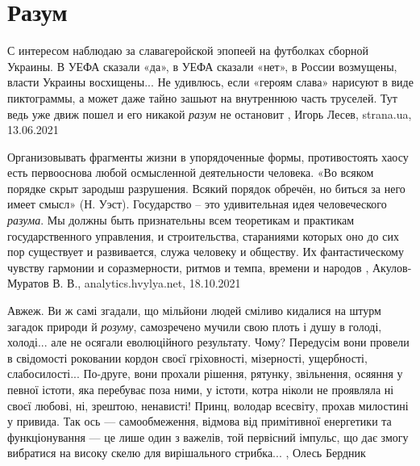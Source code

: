  
 
 
 
 
\chapter{Разум}
\label{sec:slova.razum}

С интересом наблюдаю за славагеройской эпопеей на футболках сборной Украины. В
УЕФА сказали «да», в УЕФА сказали «нет», в России возмущены, власти Украины
восхищены... Не удивлюсь, если «героям слава» нарисуют в виде пиктограммы, а
может даже тайно зашьют на внутреннюю часть труселей. Тут ведь уже движ пошел и
его никакой \emph{разум} не остановит
, 
Игорь Лесев, strana.ua, 13.06.2021

Организовывать фрагменты жизни в упорядоченные формы, противостоять хаосу есть
первооснова любой осмысленной деятельности человека. «Во всяком порядке скрыт
зародыш разрушения. Всякий порядок обречён, но биться за него имеет смысл» (Н.
Уэст).  Государство – это удивительная идея человеческого \emph{разума}. Мы должны
быть признательны всем теоретикам и практикам государственного управления, и
строительства, стараниями которых оно до сих пор существует и развивается,
служа человеку и обществу. Их фантастическому чувству гармонии и соразмерности,
ритмов и темпа, времени и народов
, 
Акулов-Муратов В. В., analytics.hvylya.net, 18.10.2021

Авжеж. Ви ж самі згадали, що мільйони людей сміливо кидалися на штурм загадок
природи й \emph{розуму}, самозречено мучили свою плоть і душу в голоді, холоді... але
не осягали еволюційного результату. Чому? Передусім вони провели в свідомості
роковании кордон своєї гріховності, мізерності, ущербності, слабосилості...
По-друге, вони прохали рішення, рятунку, звільнення, осяяння у певної істоти,
яка перебуває поза ними, у істоти, котра ніколи не проявляла ні своєї любові,
ні, зрештою, ненависті! Принц, володар всесвіту, прохав милостині у привида.
Так ось — самообмеження, відмова від примітивної енергетики та функціонування
— це лише один з важелів, той первісний імпульс, що дає змогу вибратися на
високу скелю для вирішального стрибка...
, Олесь Бердник

